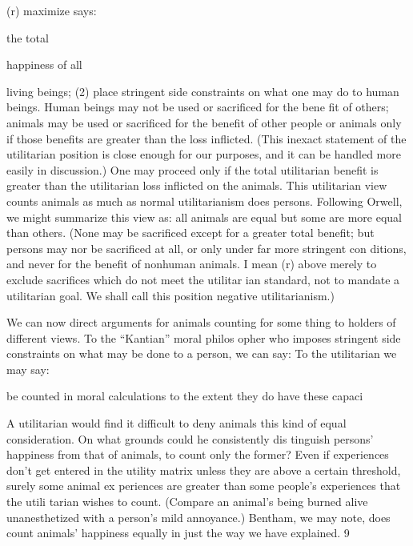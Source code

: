 \documentclass[11pt,openany]{book}
\begin{document}
(r) maximize says: 

the total 

happiness of all 

living beings; (2) place stringent side constraints on what one may do to human beings. Human beings may not be used or sacrificed for the bene fit of others; animals may be used or sacrificed for the benefit of other people or animals only if those benefits are greater than the loss inflicted. (This inexact statement of the utilitarian position is close enough for our purposes, and it can be handled more easily in discussion.) One may proceed only if the total utilitarian benefit is greater than the utilitarian loss inflicted on the animals. This utilitarian view counts animals as much as normal utilitarianism does persons. Following Orwell, we might summarize this view as: all animals are equal but some are more equal than others. (None may be sacrificed except for a greater total benefit; but persons may nor be sacrificed at all, or only under far more stringent con ditions, and never for the benefit of nonhuman animals. I mean (r) above merely to exclude sacrifices which do not meet the utilitar ian standard, not to mandate a utilitarian goal. We shall call this position negative utilitarianism.) 

We can now direct arguments for animals counting for some thing to holders of different views. To the ``Kantian'' moral philos opher who imposes stringent side constraints on what may be done to a person, we can say: To the utilitarian we may say: 

be counted in moral calculations to the extent they do have these capaci

A utilitarian would find it difficult to deny animals this kind of equal consideration. On what grounds could he consistently dis tinguish persons' happiness from that of animals, to count only the former? Even if experiences don't get entered in the utility matrix unless they are above a certain threshold, surely some animal ex periences are greater than some people's experiences that the utili tarian wishes to count. (Compare an animal's being burned alive unanesthetized with a person's mild annoyance.) Bentham, we may note, does count animals' happiness equally in just the way we have explained. 9 
\end{document}
